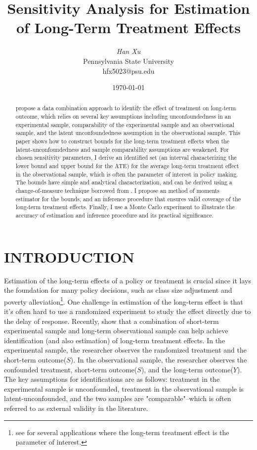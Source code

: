 \documentclass[12pt]{article}
\title{\bfseries\Large Sensitivity Analysis for Estimation of Long-Term Treatment Effects \vspace*{-1ex}}
\author{\large\textit{Han Xu} \\
	\large \textup{Pennsylvania State University}\\\textup{hfx5023@psu.edu}}
\date{\today}
\begin{document}
	
	\maketitle
	
	\begin{abstract}
	\textcite{athey2020combining} propose a data combination approach to identify the effect of treatment on long-term outcome, which relies on several key assumptions including unconfoundedness in an experimental sample, comparability of the experimental sample and an observational sample, and the latent unconfoundedness assumption in the observational sample. This paper shows how to construct bounds for the long-term treatment effects when the latent-unconfoundedness and sample comparability assumptions are weakened. For chosen sensitivity parameters, I derive an identified set (an interval characterizing the lower bound and upper bound for the ATE) for the average long-term treatment effect in the observational sample, which is often the parameter of interest in policy making.
    The bounds have simple and analytical characterization, and can be derived using a change-of-measure technique borrowed from \textcite{yadlowsky2018bounds}. 
    I propose an method of moments estimator for the bounds, and an inference procedure that ensures valid coverage of the long-term treatment effects.
    Finally, I use a Monte Carlo experiment to illustrate the accuracy of estimation and inference procedure and its practical significance.
	\end{abstract}

    \section{INTRODUCTION}
    
    Estimation of the long-term effects of a policy or treatment is crucial since it lays the foundation for many policy decisions, such as class size adjustment and poverty alleviation\footnote{see \textcite{dynarski2018closing,athey2020combining, dal2021information} for several applications where the long-term treatment effect is the parameter of interest.}. One challenge in estimation of the long-term effect is that it's often hard to use a randomized experiment to study the effect directly due to the delay of response. Recently, \textcite{athey2020combining} show that a combination of short-term experimental sample and long-term observational sample can help achieve identification (and also estimation) of long-term treatment effects. In the experimental sample, the researcher observes the randomized treatment and the short-term outcome($S$). In the observational sample, the researcher observes the confounded treatment, short-term outcome($S$), and the long-term outcome($Y$). The key assumptions for identifications are as follows: treatment in the experimental sample is unconfounded, treatment in the observational sample is latent-unconfounded, and the two samples are "comparable"--which is often referred to as external validity in the literature.
	
\end{document}

